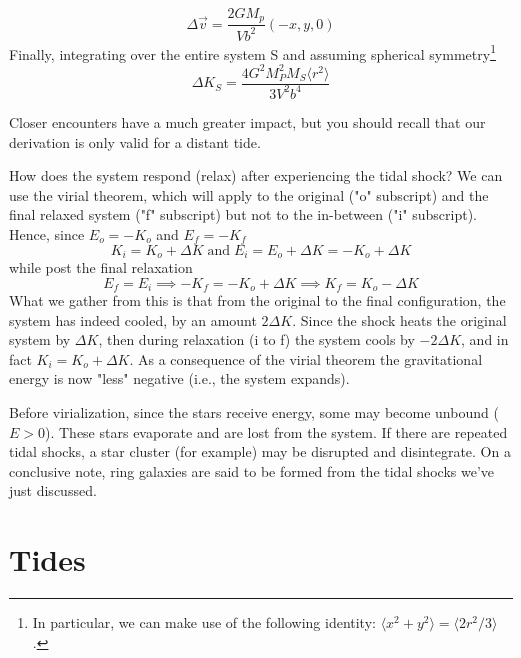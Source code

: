 \begin{equation*}
    \Delta\vec{v} = \frac{2GM_{p}}{Vb^{2}}(-x,y,0)
\end{equation*}
Finally, integrating over the entire system S and assuming spherical symmetry\footnote{In particular, we can make use of the following identity: $\langle x^{2}+y^{2}\rangle = \langle 2r^{2}/3\rangle$.}
\begin{equation}
    \Delta K_{S} = \frac{4G^{2}M_{P}^{2}M_{S}\langle r^{2}\rangle}{3V^{2}b^{4}}
    \label{eq:tidalshock}
\end{equation}
\par Closer encounters have a much greater impact, but you should recall that our derivation is only valid for a distant tide.
\par How does the system respond (relax) after experiencing the tidal shock? We can use the virial theorem, which will apply to the original ("o" subscript) and the final relaxed system ("f" subscript) but not to the in-between ("i" subscript). Hence, since $E_{o} = -K_{o}$ and $E_{f} = -K_{f}$
\begin{equation*}
    K_{i} = K_{o}+\Delta K \;\text{and}\; E_{i} = E_{o}+\Delta K = -K_{o}+\Delta K
\end{equation*}
while post the final relaxation
\begin{equation*}
    E_{f} = E_{i} \implies -K_{f} = -K_{o}+\Delta K \implies K_{f} = K_{o}-\Delta K
\end{equation*}
What we gather from this is that from the original to the final configuration, the system has indeed cooled, by an amount $2\Delta K$. Since the shock heats the original system by $\Delta K$, then during relaxation (i to f) the system cools by $-2\Delta K$, and in fact $K_{i}=K_{o}+\Delta K$. As a consequence of the virial theorem the gravitational energy is now "less" negative (i.e., the system expands).
\par Before virialization, since the stars receive energy, some may become unbound ($E > 0$). These stars evaporate and are lost from the system. If there are repeated tidal shocks, a star cluster (for example) may be disrupted and disintegrate. On a conclusive note, ring galaxies are said to be formed from the tidal shocks we've just discussed.

\section{Tides}

